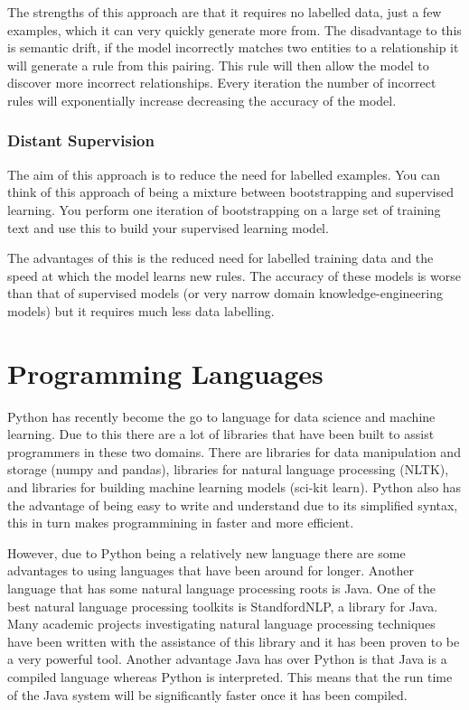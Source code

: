 The strengths of this approach are that it requires no labelled data, just a few examples, which it can very quickly generate more from. The disadvantage to this is semantic drift, if the model incorrectly matches two entities to a relationship it will generate a rule from this pairing. This rule will then allow the model to discover more incorrect relationships. Every iteration the number of incorrect rules will exponentially increase decreasing the accuracy of the model.

\subsubsection{Distant Supervision}

The aim of this approach is to reduce the need for labelled examples. You can think of this approach of being a mixture between bootstrapping and supervised learning. You perform one iteration of bootstrapping on a large set of training text and use this to build your supervised learning model.

The advantages of this is the reduced need for labelled training data and the speed at which the model learns new rules. The accuracy of these models is worse than that of supervised models (or very narrow domain knowledge-engineering models) but it requires much less data labelling.

\section{Programming Languages}
Python has recently become the go to language for data science and machine learning. Due to this there are a lot of libraries that have been built to assist programmers in these two domains. There are libraries for data manipulation and storage (numpy and pandas), libraries for natural language processing (NLTK), and libraries for building machine learning models (sci-kit learn). Python also has the advantage of being easy to write and understand due to its simplified syntax, this in turn makes programmining in faster and more efficient.

However, due to Python being a relatively new language there are some advantages to using languages that have been around for longer. Another language that has some natural language processing roots is Java. One of the best natural language processing toolkits is StandfordNLP, a library for Java. Many academic projects investigating natural language processing techniques have been written with the assistance of this library and it has been proven to be a very powerful tool. Another advantage Java has over Python is that Java is a compiled language whereas Python is interpreted. This means that the run time of the Java system will be significantly faster once it has been compiled.

